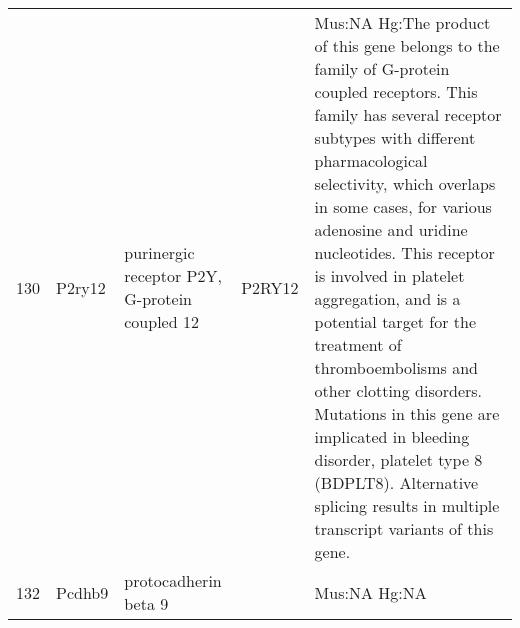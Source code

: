 \documentclass[11pt, landscape]{article}   	%
\begin{document}
\begin{table}[ht]
\begin{tabular}{rlp{3cm}lp{12cm}}
  130 & P2ry12 & purinergic receptor P2Y, G-protein coupled 12 & P2RY12 & Mus:NA Hg:The product of this gene belongs to the family of G-protein coupled receptors. This family has several receptor subtypes with different pharmacological selectivity, which overlaps in some cases, for various adenosine and uridine nucleotides. This receptor is involved in platelet aggregation, and is a potential target for the treatment of thromboembolisms and other clotting disorders. Mutations in this gene are implicated in bleeding disorder, platelet type 8 (BDPLT8). Alternative splicing results in multiple transcript variants of this gene. \\ 
  132 & Pcdhb9 & protocadherin beta 9 &  & Mus:NA Hg:NA \\ 

   \hline
\end{tabular}
\end{table}
\end{document}
